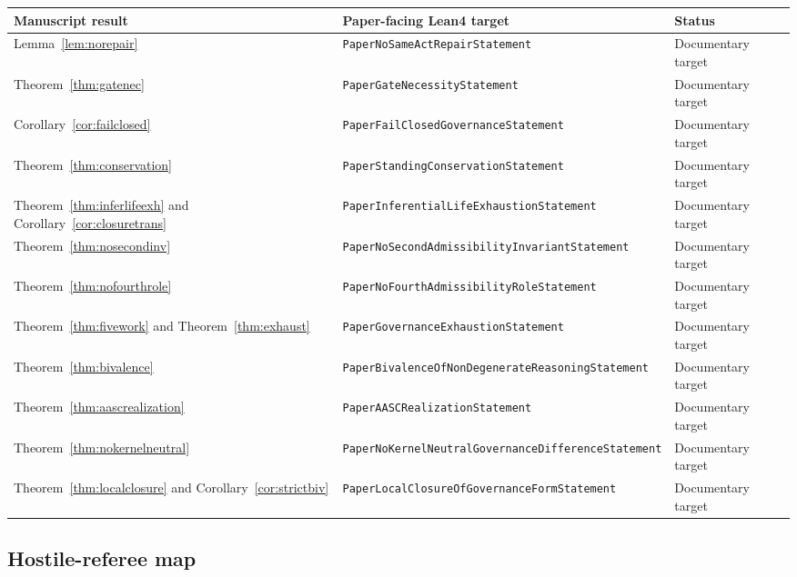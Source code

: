 \documentclass[11pt]{article}
\begin{document}
\begin{center}
\renewcommand{\arraystretch}{1.2}
\small
\begin{tabular}{|p{}|p{}|p{}|}
\hline
\textbf{Manuscript result} & \textbf{Paper-facing Lean4 target} & \textbf{Status} \\
\hline
Lemma~\ref{lem:norepair} & \texttt{PaperNoSameActRepairStatement} & Documentary target \\
\hline
Theorem~\ref{thm:gatenec} & \texttt{PaperGateNecessityStatement} & Documentary target \\
\hline
Corollary~\ref{cor:failclosed} & \texttt{PaperFailClosedGovernanceStatement} & Documentary target \\
\hline
Theorem~\ref{thm:conservation} & \texttt{PaperStandingConservationStatement} & Documentary target \\
\hline
Theorem~\ref{thm:inferlifeexh} and Corollary~\ref{cor:closuretrans} & \texttt{PaperInferentialLifeExhaustionStatement} & Documentary target \\
\hline
Theorem~\ref{thm:nosecondinv} & \texttt{PaperNoSecondAdmissibilityInvariantStatement} & Documentary target \\
\hline
Theorem~\ref{thm:nofourthrole} & \texttt{PaperNoFourthAdmissibilityRoleStatement} & Documentary target \\
\hline
Theorem~\ref{thm:fivework} and Theorem~\ref{thm:exhaust} & \texttt{PaperGovernanceExhaustionStatement} & Documentary target \\
\hline
Theorem~\ref{thm:bivalence} & \texttt{PaperBivalenceOfNonDegenerateReasoningStatement} & Documentary target \\
\hline
Theorem~\ref{thm:aascrealization} & \texttt{PaperAASCRealizationStatement} & Documentary target \\
\hline
Theorem~\ref{thm:nokernelneutral} & \texttt{PaperNoKernelNeutralGovernanceDifferenceStatement} & Documentary target \\
\hline
Theorem~\ref{thm:localclosure} and Corollary~\ref{cor:strictbiv} & \texttt{PaperLocalClosureOfGovernanceFormStatement} & Documentary target \\
\hline
\end{tabular}
\end{center}

\subsection*{Hostile-referee map}
\end{document}
